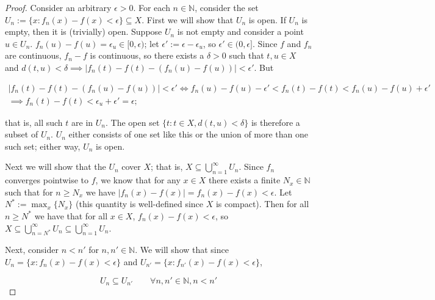 \begin{proof}

Consider an arbitrary \(\epsilon > 0\). For each \(n \in \mathbb{N}\), consider the set \(U_n := \{x : f_n(x) - f(x) < \epsilon\} \subseteq X\). First we will show that \(U_n\) is open. If \(U_n\) is empty, then it is (trivially) open. Suppose \(U_n\) is not empty and consider a point \(u \in U_n\). \(f_n(u) - f(u) = \epsilon_u \in[0, \epsilon)\); let \(\epsilon' := \epsilon - \epsilon_u\), so \(\epsilon' \in (0, \epsilon]\). Since \(f\) and \(f_n\) are continuous, \(f_n - f\) is continuous, so there exists a \(\delta > 0\) such that \(t, u \in X\) and \(d(t, u) < \delta \implies |f_n(t) - f(t) - (f_n(u) - f(u))| < \epsilon'\). But

\begin{multline*}
\left|f_n(t) - f(t) - (f_n(u) - f(u)) \right|  < \epsilon' \iff  f_n(u) - f(u)  - \epsilon' < f_n(t) - f(t) < f_n(u) - f(u)  + \epsilon'
\\ \implies f_n(t) - f(t) < \epsilon_u + \epsilon' = \epsilon;
\end{multline*}

 that is, all such \(t\) are in \(U_n\). The open set \(\{t: t \in X, d(t, u) < \delta \}\) is therefore a subset of \(U_n\). \(U_n\) either consists of one set like this or the union of more than one such set; either way, \(U_n\) is open.

Next we will show that the \(U_n\) cover \(X\); that is, \(X \subseteq \bigcup_{n=1}^\infty U_n\). Since \(f_n\) converges pointwise to \(f\), we know that for any \(x \in X\) there exists a finite \(N_x \in \mathbb{N}\) such that for \( n \geq N_x\) we have \(| f_n(x) - f(x) | = f_n(x) - f(x)  < \epsilon\). Let \(N^* := \max_x \{N_x\}\) (this quantity is well-defined since \(X\) is compact). Then for all \(n \geq N^*\) we have that for all \(x \in X\), \(f_n(x) - f(x)  < \epsilon\), so \(X \subseteq \bigcup_{n=N^*}^\infty U_n \subseteq \bigcup_{n=1}^\infty U_n\).

Next, consider \(n < n'\) for \(n, n' \in \mathbb{N}\). We will show that since \(U_n = \{x : f_n(x) - f(x) < \epsilon\} \) and \(U_{n'} = \{x : f_{n'}(x) - f(x) < \epsilon\} \), 

\begin{equation}\label{realan.425b.hw1.1a}
U_n \subseteq U_{n'} \qquad \forall n, n' \in \mathbb{N}, n < n'
\end{equation}


\end{proof}
